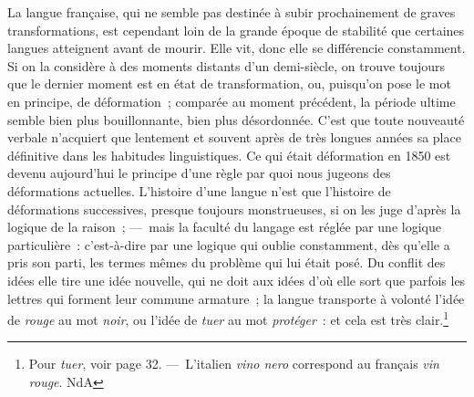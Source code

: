 \documentclass[french,twoside]{book} %
\begin{document}
La langue française, qui ne semble pas destinée à subir prochainement de graves transformations, est cependant loin de la grande époque de stabilité que certaines langues atteignent avant de mourir. Elle vit, donc elle se différencie constamment. Si on la considère à des moments distants d’un demi-siècle, on trouve toujours que le dernier moment est en état de transformation, ou, puisqu’on pose le mot en principe, de déformation ; comparée au moment précédent, la période ultime semble bien plus bouillonnante, bien plus désordonnée. C’est que toute nouveauté verbale n’acquiert que lentement et souvent après de très longues années sa place définitive dans les habitudes linguistiques. Ce qui était déformation en 1850 est devenu aujourd’hui le principe d’une règle par quoi nous jugeons des déformations actuelles. L’histoire d’une langue n’est que l’histoire de déformations successives, presque toujours monstrueuses, si on les juge d’après la logique de la raison ; — mais la faculté du langage est réglée par une logique particulière : c’est-à-dire par une logique qui oublie constamment, dès qu’elle a pris son parti, les termes mêmes du problème qui lui était posé. Du conflit des idées elle tire une idée nouvelle, qui ne doit aux idées d’où elle sort que parfois les lettres qui forment leur commune armature ; la langue transporte à volonté l’idée de {\itshape rouge} au mot {\itshape noir}, ou l’idée de {\itshape tuer} au mot {\itshape protéger} : et cela est très clair.\footnote{ Pour {\itshape tuer}, voir page 32. — L’italien {\itshape vino nero} correspond au français {\itshape vin rouge}. NdA}\par
\end{document}
